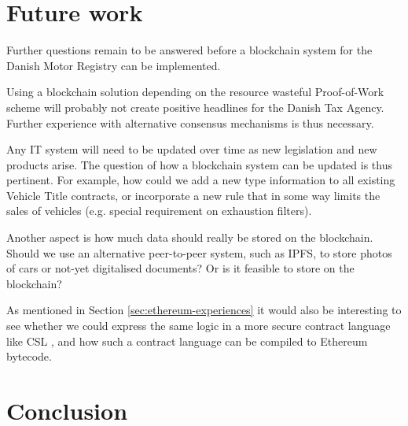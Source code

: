 \documentclass[oneside,a4paper,10pts,article]{memoir}
\begin{document}



\chapter{Future work}
\label{sec:futurework}
Further questions remain to be answered before a blockchain system for
the Danish Motor Registry can be implemented.

Using a blockchain solution depending on the resource wasteful
Proof-of-Work scheme will probably not create positive headlines for
the Danish Tax Agency. Further experience with alternative consensus
mechanisms is thus necessary.

Any IT system will need to be updated over time as new legislation and
new products arise. The question of how a blockchain system can be
updated is thus pertinent. For example, how could we add a new type
information to all existing Vehicle Title contracts, or incorporate a
new rule that in some way limits the sales of vehicles (e.g. special
requirement on exhaustion filters).

Another aspect is how much data should really be stored on the
blockchain. Should we use an alternative peer-to-peer system, such as
IPFS, to store photos of cars or not-yet digitalised documents? Or is
it feasible to store on the blockchain?

As mentioned in Section \ref{sec:ethereum-experiences} it would also
be interesting to see whether we could express the same logic in a
more secure contract language like CSL \cite{hvitved2011contract}, and
how such a contract language can be compiled to Ethereum bytecode.

\chapter{Conclusion}
\label{sec:conclusion}






\end{document}
